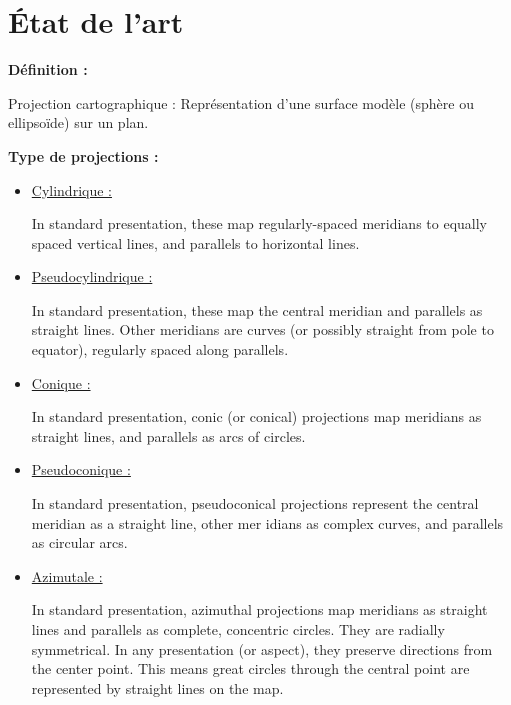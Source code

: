\documentclass{article}
\begin{document}
\vspace{1\baselineskip}
\section{ État de l'art}

\textbf{Définition :} \newline

Projection cartographique : Représentation
d'une surface modèle (sphère ou ellipsoïde) sur un plan. \newline

\textbf{Type de projections :}
\begin{itemize}
    \item \underline{Cylindrique :}
        \begin{itemize}
            In standard presentation, these map regularly-spaced meridians to equally spaced 
            vertical lines, and parallels to horizontal lines.
        \end{itemize}
    \item \underline{Pseudocylindrique :}
        \begin{itemize} In standard presentation, these map the central meridian and parallels as straight lines. 
        Other meridians are curves (or possibly straight from pole to equator), regularly spaced 
        along parallels.
        \end{itemize}
    \item \underline{Conique :}
        \begin{itemize} In standard presentation, conic (or conical) projections map meridians as straight lines, 
        and parallels as arcs of circles.
        \end{itemize}
    \item \underline{Pseudoconique :}
        \begin{itemize} In standard presentation, pseudoconical projections represent the central meridian as a 
        straight line, other mer
        idians as complex curves, and parallels as circular arcs.
        \end{itemize}
    \item \underline{Azimutale :}
        \begin{itemize} In standard presentation, azimuthal projections map meridians as straight lines and 
        parallels as complete, concentric circles. They are radially symmetrical. In any 
        presentation (or aspect), they preserve directions from the center point. This means great 
        circles through the central point are represented by straight lines on the map.

\end{itemize}
\end{itemize}
\end{document}
